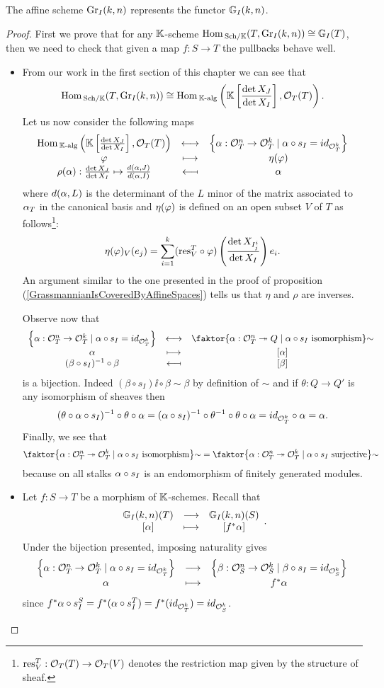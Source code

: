 \begin{proposition}\label{GrIRepresentGrIFunctors}
The affine scheme $\mathrm{Gr}_I(k,n)$ represents the functor $\mathbb{G}_I(k,n)$.
\end{proposition}
\begin{proof}
First we prove that for any $\mathbb{K}$-scheme $\mathrm{Hom}\,_{{\mathrm{Sch}}/{\mathbb{K}}}(T,\mathrm{Gr}_I(k,n))\cong \mathbb{G}_I(T)$, then we need to check that given a map $f:S\to T$ the pullbacks behave well.
\setlength{\leftmargini}{0cm}
\begin{itemize}
\item From our work in the first section of this chapter we can see that
\[\mathrm{Hom}\,_{{\mathrm{Sch}}/{\mathbb{K}}}(T,\mathrm{Gr}_I(k,n))\cong \mathrm{Hom}\,_{\mathbb{K}\text{-alg}}\left({\mathbb{K}\left[{\frac{\det X_J}{\det X_I}}\right],\mathcal{O}_T(T)}\right).\]
Let us now consider the following maps
\[\begin{array}{ccc} {\mathrm{Hom}\,_{\mathbb{K}\text{-alg}}\left({\mathbb{K}\left[{\frac{\det X_J}{\det X_I}}\right],\mathcal{O}_T(T)}\right)} & \longleftrightarrow & {\left\{{\alpha:\mathcal{O}_T^n\to \mathcal{O}_T^k\mid \alpha\circ s_I=id_{\mathcal{O}_T^k}}\right\}}\\ {\varphi} & \longmapsto & {\eta(\varphi)}\\ {\rho(\alpha):\frac{\det X_J}{\det X_I}\mapsto \frac{d(\alpha,J)}{d(\alpha,I)}} & \longmapsfrom & {\alpha} \end{array}\]
where $d(\alpha,L)$ is the determinant of the $L$ minor of the matrix associated to $\alpha_T$ in the canonical basis and $\eta(\varphi)$ is defined on an open subset $V$ of $T$ as follows\footnote{$\mathrm{res}^T_V:\mathcal{O}_T(T)\to \mathcal{O}_T(V)$ denotes the restriction map given by the structure of sheaf.}:
\[\eta(\varphi)_V(e_j)=\sum_{i=1}^k (\mathrm{res}^T_V\circ\varphi)\left({\frac{\det X_{I^i_j}}{\det X_I}}\right)e_i.\]
An argument similar to the one presented in the proof of proposition (\ref{GrassmannianIsCoveredByAffineSpaces}) tells us that $\eta$ and $\rho$ are inverses.
\medskip

\noindent Observe now that
\[\correspDef{\cpa{\al:\Oc_T^n\to \Oc_T^k\mid \al\circ s_I=id_{\Oc_T^k}}}{\quot{\cpa{\al:\Oc_T^n\onto Q\mid \al\circ s_I\text{ isomorphism}}}\sim}{\al}{[\al]}{(\beta\circ s_I)\ii\circ \beta}{[\beta]}\]
is a bijection. Indeed $(\beta\circ s_I)\ii\circ \beta\sim \beta$ by definition of $\sim$ and if $\theta:Q\to Q'$ is any isomorphism of sheaves then
\[(\theta \circ \alpha \circ s_I)^{-1} \circ \theta\circ \alpha=(\alpha\circ s_I)^{-1}\circ \theta^{-1}\circ \theta\circ \alpha=id_{\mathcal{O}^k_T}\circ \alpha=\alpha.\]
Finally, we see that
\[\quot{\cpa{\al:\Oc_T^n\onto \Oc_T^k\mid \al\circ s_I\text{ isomorphism}}}\sim=\quot{\cpa{\al:\Oc_T^n\onto \Oc_T^k\mid \al\circ s_I\text{ surjective}}}\sim\]
because on all stalks $\alpha\circ s_I$ is an endomorphism of finitely generated modules.
\item Let $f:S\to T$ be a morphism of $\mathbb{K}$-schemes. Recall that
\[\begin{array}{ccc} {\mathbb{G}_I(k,n)(T)} & \longrightarrow & {\mathbb{G}_I(k,n)(S)}\\ {[\alpha]} & \longmapsto & {[f^\ast \alpha]} \end{array}.\]
Under the bijection presented, imposing naturality gives
\[\begin{array}{ccc} {\left\{{\alpha:\mathcal{O}_T^n\to \mathcal{O}_T^k\mid \alpha\circ s_I=id_{\mathcal{O}_T^k}}\right\}} & \longrightarrow & {\left\{{\beta:\mathcal{O}_S^n\to \mathcal{O}_S^k\mid \beta\circ s_I=id_{\mathcal{O}_S^k}}\right\}}\\ {\alpha} & \longmapsto & {f^\ast\alpha} \end{array}\]
since $f^\ast\alpha\circ s_I^S=f^\ast(\alpha\circ s_I^T)=f^\ast(id_{\mathcal{O}^k_T})=id_{\mathcal{O}^k_S}$.
\smallskip


\end{itemize}
\end{proof}
